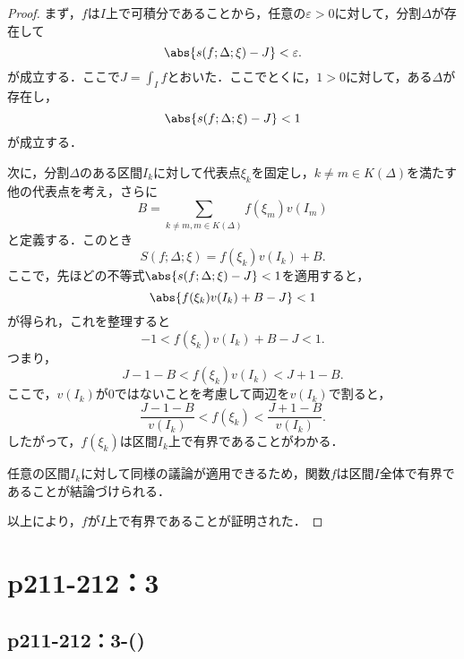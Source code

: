 \documentclass[a4paper,10pt,fleqn]{ltjsarticle}
\begin{document}
\begin{tleftbar}
    \begin{proof}
        まず，$f$は$I$上で可積分であることから，任意の$\varepsilon >0$に対して，分割$\Delta$が存在して
        \[
            \abs{s(f; \Delta; \xi) - J} < \varepsilon.
        \]
        が成立する．ここで$J = \int_I f$とおいた．ここでとくに，$1 >0$に対して，ある$\Delta$が存在し，
        \[
            \abs{ s(f; \Delta; \xi) - J } < 1
        \]
        が成立する．

        次に，分割$\Delta$のある区間$I_k$に対して代表点$\xi_k$を固定し，$k \ne m \in K(\Delta)$を満たす他の代表点を考え，さらに
        \[
            B = \sum_{k \ne m , m \in K(\Delta)} f(\xi_m) v(I_m)
        \]
        と定義する．このとき
        \[
            S(f; \Delta; \xi) = f(\xi_k) v(I_k) + B.
        \]
        ここで，先ほどの不等式$\abs{ s(f; \Delta; \xi) - J } < 1$を適用すると，
        \[
            \abs{ f(\xi_k) v(I_k) + B - J } < 1
        \]
        が得られ，これを整理すると
        \[
            -1 < f(\xi_k) v(I_k) + B - J < 1.
        \]
        つまり，
        \[
            J - 1 - B < f(\xi_k) v(I_k) < J + 1 - B.
        \]
        ここで，$v(I_k)$が$0$ではないことを考慮して両辺を$v(I_k)$で割ると，
        \[
            \frac{J - 1 - B}{v(I_k)} < f(\xi_k) < \frac{J + 1 - B}{v(I_k)}.
        \]
        したがって，$f(\xi_k)$は区間$I_k$上で有界であることがわかる．

        任意の区間$I_k$に対して同様の議論が適用できるため，関数$f$は区間$I$全体で有界であることが結論づけられる．

        以上により，$f$が$I$上で有界であることが証明された．
    \end{proof}
\end{tleftbar}


\section*{p211-212：3}


\subsection*{p211-212：3-()}
\end{document}
